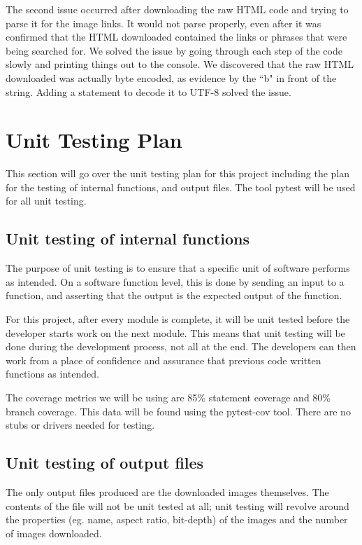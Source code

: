 \documentclass[12pt, titlepage]{article}
\begin{document}
The second issue occurred after downloading the raw HTML code and trying to parse it for the image links. It would not parse properly, even after it was confirmed that the HTML downloaded contained the links or phrases that were being searched for. We solved the issue by going through each step of the code slowly and printing things out to the console. We discovered that the raw HTML downloaded was actually byte encoded, as evidence by the ``b" in front of the string. Adding a statement to decode it to UTF-8 solved the issue.
	
\section{Unit Testing Plan}
\label{Unit Testing Plan}

This section will go over the unit testing plan for this project including the plan for the testing of internal functions, and output files. The tool pytest will be used for all unit testing.
		
\subsection{Unit testing of internal functions}

The purpose of unit testing is to ensure that a specific unit of software performs as intended. On a software function level, this is done by sending an input to a function, and asserting that the output is the expected output of the function.

For this project, after every module is complete, it will be unit tested before the developer starts work on the next module. This means that unit testing will be done during the development process, not all at the end. The developers can then work from a place of confidence and assurance that previous code written functions as intended.

The coverage metrics we will be using are 85\% statement coverage and 80\% branch coverage. This data will be found using the pytest-cov tool. There are no stubs or drivers needed for testing.
		
\subsection{Unit testing of output files}

The only output files produced are the downloaded images themselves. The contents of the file will not be unit tested at all; unit testing will revolve around the properties (eg. name, aspect ratio, bit-depth) of the images and the number of images downloaded.
\end{document}
